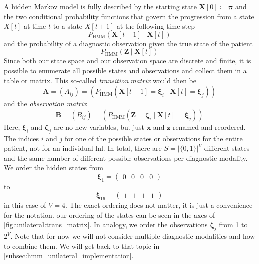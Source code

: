 \documentclass[\relativeRoot/main.tex]{subfiles}
\begin{document}
A hidden Markov model is fully described by the starting state $\mathbf{X}[0] \coloneqq \boldsymbol{\pi}$ and the two conditional probability functions that govern the progression from a state $X[t]$ at time $t$ to a state $X[t+1]$ at the following time-step
%
\begin{equation}
    P_\text{HMM}\left( \mathbf{X}[t+1] \mid \mathbf{X}[t] \right)
\end{equation}
%
and the probability of a diagnostic observation given the true state of the patient
%
\begin{equation}
    P_\text{HMM}\left( \mathbf{Z} \mid \mathbf{X}[t] \right)
\end{equation}
%
Since both our state space and our observation space are discrete and finite, it is possible to enumerate all possible states and observations and collect them in a table or matrix. This so-called \emph{transition matrix} would then be
%
\begin{equation}
    \mathbf{A} = \left( A_{ij} \right) = \left( P_\text{HMM} \left( \mathbf{X}[t+1] = \boldsymbol{\xi}_i \mid \mathbf{X}[t] = \boldsymbol{\xi}_j \right) \right)
\end{equation}
%
and the \emph{observation matrix}
%
\begin{equation}
    \mathbf{B} = \left( B_{ij} \right) = \left( P_\text{HMM} \left( \mathbf{Z} = \boldsymbol{\zeta}_i \mid \mathbf{X}[t] = \boldsymbol{\xi}_j \right) \right)
\end{equation}
%
Here, $\boldsymbol{\xi}_i$ and $\boldsymbol{\zeta}_j$ are no new variables, but just $\mathbf{x}$ and $\mathbf{z}$ renamed and reordered. The indices $i$ and $j$ for one of the possible states or observations for the entire patient, not for an individual \gls{lnl}. In total, there are $S = |\{ 0,1 \}|^V$ different states and the same number of different possible observations per diagnostic modality. We order the hidden states from
%
\begin{equation}
    \boldsymbol{\xi}_1 = 
    \begin{pmatrix}
        0 & 0 & 0 & 0
    \end{pmatrix}
\end{equation}
%
to
%
\begin{equation} \label{eq:unilateral:formulation:obs_matrix}
    \boldsymbol{\xi}_{16} = 
    \begin{pmatrix}
        1 & 1 & 1 & 1
    \end{pmatrix}
\end{equation}
%
in this case of $V = 4$. The exact ordering does not matter, it is just a convenience for the notation. our ordering of the states can be seen in the axes of \cref{fig:unilateral:trans_matrix}. In analogy, we order the observations $\boldsymbol{\zeta}_j$ from 1 to $2^V$. Note that for now we will not consider multiple diagnostic modalities and how to combine them. We will get back to that topic in \cref{subsec:hmm_unilateral_implementation}.
\end{document}
